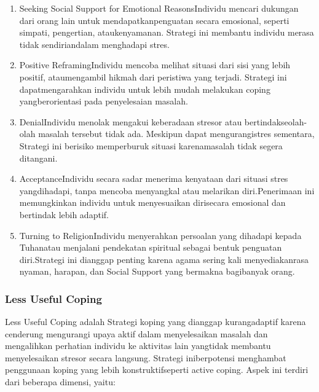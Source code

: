 \documentclass[../manperil.tex]{subfiles}
\begin{document}
\begin{enumerate}
	\item Seeking Social Support for Emotional ReasonsIndividu mencari dukungan dari orang lain untuk mendapatkanpenguatan secara emosional, seperti simpati, pengertian, ataukenyamanan. Strategi ini membantu individu merasa tidak sendiriandalam menghadapi stres.
	\item Positive ReframingIndividu mencoba melihat situasi dari sisi yang lebih positif, ataumengambil hikmah dari peristiwa yang terjadi. Strategi ini dapatmengarahkan individu untuk lebih mudah melakukan coping yangberorientasi pada penyelesaian masalah.
	\item DenialIndividu menolak mengakui keberadaan stresor atau bertindakseolah-olah masalah tersebut tidak ada. Meskipun dapat mengurangistres sementara, Strategi ini berisiko memperburuk situasi karenamasalah tidak segera ditangani.
	\item AcceptanceIndividu secara sadar menerima kenyataan dari situasi stres yangdihadapi, tanpa mencoba menyangkal atau melarikan diri.Penerimaan ini memungkinkan individu untuk menyesuaikan dirisecara emosional dan bertindak lebih adaptif.
	\item Turning to ReligionIndividu menyerahkan persoalan yang dihadapi kepada Tuhanatau menjalani pendekatan spiritual sebagai bentuk penguatan diri.Strategi ini dianggap penting karena agama sering kali menyediakanrasa nyaman, harapan, dan Social Support yang bermakna bagibanyak orang.
\end{enumerate}
\subsubsection{Less Useful Coping}%
\label{ssub:less_useful_coping}
Less Useful Coping adalah Strategi koping yang dianggap kurangadaptif karena cenderung mengurangi upaya aktif dalam menyelesaikan masalah dan mengalihkan perhatian individu ke aktivitas lain yangtidak membantu menyelesaikan stresor secara langsung. Strategi iniberpotensi menghambat penggunaan koping yang lebih konstruktifseperti active coping. Aspek ini terdiri dari beberapa dimensi, yaitu:
\end{document}
